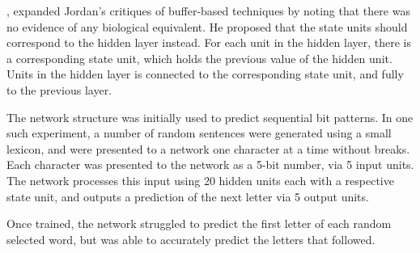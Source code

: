 


\cite{Elman:1990:Finding}, expanded Jordan's critiques of buffer-based
techniques by noting that there was no evidence of any biological equivalent.
He proposed that the state units should correspond to the hidden layer instead.
For each unit in the hidden layer, there is a corresponding state unit, which
holds the previous value of the hidden unit.
Units in the hidden layer is connected to the corresponding state unit, and
fully to the previous layer.
\begin{center}
    
\end{center}
The network structure was initially used to predict sequential bit patterns.
In one such experiment, a number of random sentences were generated using a
small lexicon, and were presented to a network one character at a time without
breaks.
Each character was presented to the network as a 5-bit number, via 5 input
units.
The network processes this input using 20 hidden units each with a respective
state unit, and outputs a prediction of the next letter via 5 output units.

Once trained, the network struggled to predict the first letter of each random
selected word, but was able to accurately predict the letters that followed.



%    










